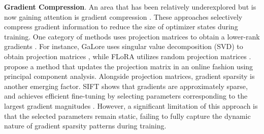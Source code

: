 \textbf{Gradient Compression}. An area that has been relatively underexplored but is now gaining attention is gradient compression \citep{zhao2024galorememoryefficientllmtraining,hao2024floralowrankadapterssecretly,liang2024memoryefficientllmtrainingonline,wu2024cgfedllmcompressgradientsfederated,song2024sparsefinetuningpretrainedlarge}. These approaches selectively compress gradient information to reduce the size of optimizer states during training. One category of methods uses projection matrices to obtain a lower-rank gradients \citep{zhao2024galorememoryefficientllmtraining,hao2024floralowrankadapterssecretly,liang2024memoryefficientllmtrainingonline}. For instance, GaLore uses singular value decomposition (SVD) to obtain projection matrices \citep{zhao2024galorememoryefficientllmtraining}, while FLoRA utilizes random projection matrices \citep{hao2024floralowrankadapterssecretly}. \citet{liang2024memoryefficientllmtrainingonline} propose a method that updates the projection matrix in an online fashion using principal component analysis. Alongside projection matrices, gradient sparsity is another emerging factor. SIFT shows that gradients are approximately sparse, and achieves efficient fine-tuning by selecting parameters corresponding to the largest gradient magnitudes \citep{song2024sparsefinetuningpretrainedlarge}. However, a significant limitation of this approach is that the selected parameters remain static, failing to fully capture the dynamic nature of gradient sparsity patterns during training.